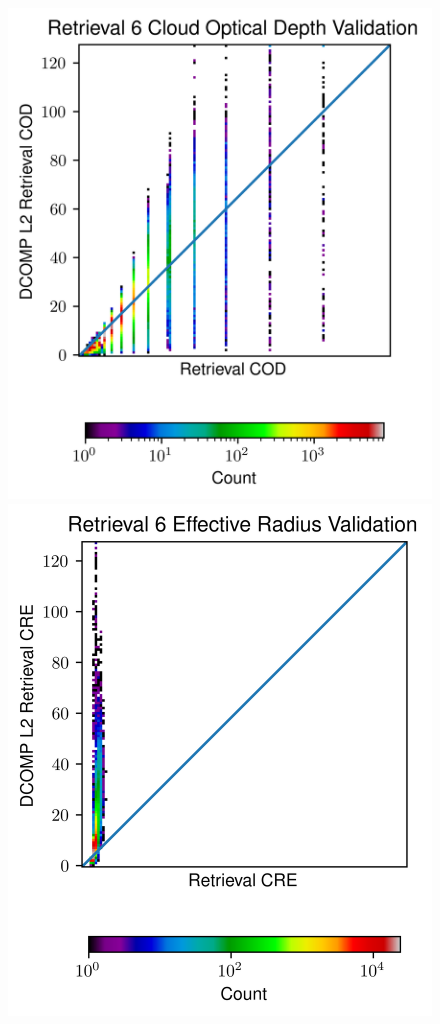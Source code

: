 \documentclass[12pt]{article}
\begin{document}
\begin{figure}[h!]
\begin{center}
{            \includegraphics[width=.36\paperwidth]{figs/val_ret6_cod.png}
            \includegraphics[width=.34\paperwidth]{figs/val_ret6_cre.png}
}
\end{center}
\end{figure}
\end{document}
